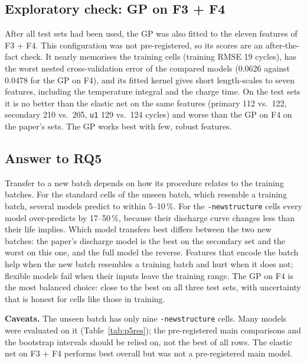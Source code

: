 \subsection{Exploratory check: GP on F3 + F4}
After all test sets had been used, the GP was also fitted to the eleven
features of F3 + F4. This configuration was not pre-registered, so its scores
are an after-the-fact check. It nearly memorises the training cells (training
RMSE 19 cycles), has the worst nested cross-validation error of the compared
models (0.0626 against 0.0478 for the GP on F4), and its fitted kernel gives short
length-scales to seven features, including the temperature integral and the
charge time. On the test sets it is no better than the elastic net on the same
features (primary 112 vs.\ 122, secondary 210 vs.\ 205, \texttt{u1} 129 vs.\ 124
cycles) and worse than the GP on F4 on the paper's sets. The GP works best with
few, robust features.

\subsection{Answer to RQ5}
Transfer to a new batch depends on how its procedure relates to the training
batches. For the standard cells of the unseen batch, which resemble a training
batch, several models predict to within 5--10\,\%. For the
\texttt{-newstructure} cells every model over-predicts by 17--50\,\%, because their
discharge curve changes less than their life implies. Which model transfers
best differs between the two new batches: the paper's discharge model is the
best on the secondary set and the worst on this one, and the full model the
reverse. Features that encode the batch help when the new batch resembles a
training batch and hurt when it does not; flexible models fail when their
inputs leave the training range. The GP on F4 is the most balanced choice:
close to the best on all three test sets, with uncertainty that is honest for
cells like those in training.

\textbf{Caveats.} The unseen batch has only nine \texttt{-newstructure}
cells. Many models were evaluated on it (Table~\ref{tab:p5res}); the
pre-registered main comparisons and the bootstrap intervals should be relied
on, not the best of all rows. The elastic net on F3 + F4 performs best overall
but was not a pre-registered main model.

